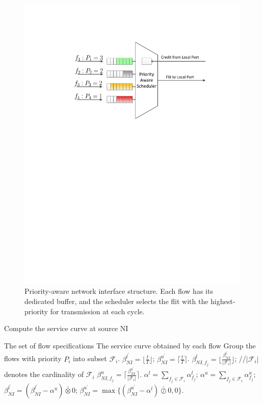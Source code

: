 \documentclass[preprint]{elsarticle}
\begin{document}
\begin{figure}
  \centering
  \includegraphics[scale=0.45]{figures/NI.pdf}
  \caption{Priority-aware network interface structure. Each flow has its dedicated buffer, and the scheduler selects the flit with the highest-priority for transmission at each cycle.}\label{ni}
\end{figure}
\begin{algorithm}
\caption{Compute the service curve at source NI}\label{alg:scatni}
\begin{algorithmic}[1]
\Require The set of flow specifications
\Ensure The service curve obtained by each flow
\State Group the flows with priority $P_i$ into subset $\mathcal{F}_i$.
\State $\beta_{NI}^{l^\prime}=\lfloor\frac{t}{T}\rfloor$; $\beta_{NI}^{u^\prime}=\lceil\frac{t}{T}\rceil$.
        \State $\beta_{NI,f_j}^l=\lfloor\frac{\beta_{NI}^{l^\prime}}{|\mathcal{F}_i|}\rfloor$; //$|\mathcal{F}_i|$ denotes the cardinality of $\mathcal{F}_i$
        \State $\beta_{NI,f_j}^u=\lceil\frac{\beta_{NI}^{u^\prime}}{|\mathcal{F}_i|}\rceil$.
    \EndFor
    \State $\alpha^l=\sum_{f_j\in \mathcal{F}_i}\alpha^l_{f_j}$; $\alpha^u=\sum_{f_j\in \mathcal{F}_i}\alpha^u_{f_j}$;
    \State $\beta_{NI}^{l^\prime}=(\beta_{NI}^{l^\prime}-\alpha^u)\bar{\otimes}0$; $\beta_{NI}^{u^\prime}=\max\{(\beta_{NI}^{u^\prime}-\alpha^l)\bar{\oslash}0,0\}$.
\EndFor
\end{algorithmic}
\end{algorithm}
\end{document}
